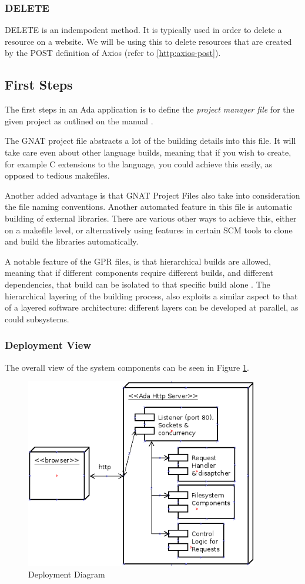 \subsubsection{DELETE} 
DELETE is an indempodent method. It is typically used in order to delete a resource on a website.
We will be using this to delete resources that are created by the POST definition of Axios (refer to \ref{http:axios-post}).

\subsection{First Steps}
The first steps in an Ada application is to define the \textit{project manager  file} for the given project as outlined on the manual \cite{GNATintro}.

The GNAT project file abstracts a lot of the building details into this file. It will take care even about other language builds, meaning that if you wish to create, for example C extensions to the language, you could achieve this easily, as opposed to tedious makefiles. 

Another added advantage is that GNAT Project Files also take into consideration the file naming conventions. Another automated feature in this file is automatic building of external libraries. There are various other ways to achieve this, either on a makefile level, or alternatively using features in certain SCM tools to clone and build the libraries automatically. 

A notable feature of the GPR files, is that hierarchical builds are allowed, meaning that if different components require different builds, and different dependencies, that build can be isolated to that specific build alone \cite{GNATintro}. The hierarchical layering of the building process, also exploits a similar aspect to that of a layered software architecture: different layers can be developed at parallel, as could subsystems. 

\subsubsection{Deployment View}
The overall view of the system components can be seen in Figure \ref{fig:deployment}. 

\begin{figure}[hb]
\centering
\includegraphics[width=4in]{gfx/deployment.png}
\caption{Deployment Diagram}
\label{fig:deployment}
\end{figure}
